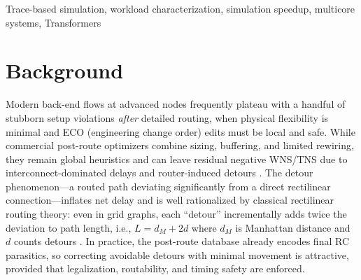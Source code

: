  



 

\begin{abstract}
pass
\end{abstract}
\begin{IEEEkeywords}Trace-based simulation, workload characterization, simulation speedup, multicore systems, Transformers
\end{IEEEkeywords}

\maketitle

\section{Background}
Modern back-end flows at advanced nodes frequently plateau with a handful of stubborn setup violations \emph{after} detailed routing, when physical flexibility is minimal and ECO (engineering change order) edits must be local and safe. While commercial post-route optimizers combine sizing, buffering, and limited rewiring, they remain global heuristics and can leave residual negative WNS/TNS due to interconnect-dominated delays and router-induced detours \cite{Coudert-ISQED02,CadenceInnovus-DS}. The detour phenomenon---a routed path deviating significantly from a direct rectilinear connection---inflates net delay and is well rationalized by classical rectilinear routing theory: even in grid graphs, each ``detour'' incrementally adds twice the deviation to path length, i.e., $L = d_{M} + 2d$ where $d_{M}$ is Manhattan distance and $d$ counts detours \cite{Hadlock-Networks77}. In practice, the post-route database already encodes final RC parasitics, so correcting avoidable detours with minimal movement is attractive, provided that legalization, routability, and timing safety are enforced.

